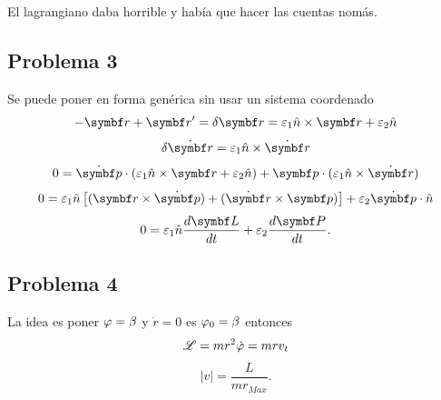\documentclass[10pt,oneside]{CBFT_book}
\begin{document}
El lagrangiano daba horrible y había que hacer las cuentas nomás.

\subsection{Problema 3}

Se puede poner en forma genérica sin usar un sistema coordenado
\[
	-\vb{r} + \vb{r}'= \delta \vb{r} = \varepsilon_1 \hat{n} \times \vb{r} + \varepsilon_2 \hat{n}
\]
\[
	\delta \dot{\vb{r}} = \varepsilon_1 \hat{n} \times \dot{\vb{r}}
\]
\[
	0 = \dot{\vb{p}} \cdot (\varepsilon_1 \hat{n} \times \vb{r} + \varepsilon_2 \hat{n}) + 
	\vb{p} \cdot (\varepsilon_1 \hat{n} \times \dot{\vb{r}})
\]
\[
	0 = \varepsilon_1 \hat{n} \left[ ( \vb{r} \times \dot{\vb{p}} ) + ( \dot{\vb{r}} \times \vb{p} ) \right]
	+ \varepsilon_2 \dot{\vb{p}} \cdot \hat{n}
\]
\[
	0 = \varepsilon_1 \hat{n} \dtot{\vb{L}}{t} + \varepsilon_2 \dtot{\vb{P}}{t}.
\]

\subsection{Problema 4}

La idea es poner $\varphi = \beta$ y $\dot{r}=0$ es $\varphi_0 = \beta$ entonces
\[
	\mathscr{L} = m r^2 \dot{\varphi} = m r v_t 
\]
\[
	|v| = \frac{ L }{ m r_{Max} }.
\]

\end{document}
